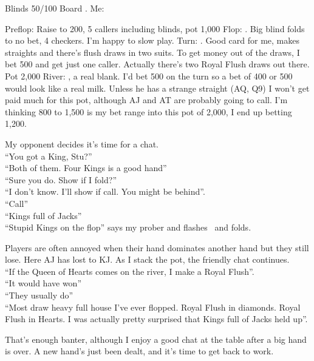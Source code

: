 Blinds 50/100 Board \Kd\Kh\Jd\tenh\tres. Me: \Kc\Jc

Preflop: Raise to 200, 5 callers including blinds, pot 1,000
Flop: \Kd\Kh\Jd. Big blind folds to no bet, 4 checkers. I'm happy to slow play.
Turn: \tenh. Good card for me, makes straights and there's flush draws in two
      suits. To get money out of the draws, I bet 500 and get just one caller.
      Actually there's two Royal Flush draws out there. Pot 2,000
River: \tres, a real blank. I'd bet 500 on the turn so a bet of 400 or 500 would
      look like a real milk. Unless he has a strange straight (AQ, Q9) I
      won't get paid much for this pot, although AJ and AT are probably going
      to call. I'm thinking 800 to 1,500 is my bet range into this pot of 2,000,
      I end up betting 1,200.

My opponent decides it's time for a chat.\\
``You got a King, Stu?'' \\
``Both of them. Four Kings is a good hand'' \\
``Sure you do. Show if I fold?'' \\
``I don't know. I'll show if call. You might be behind''. \\
``Call'' \\
``Kings full of Jacks'' \\
``Stupid Kings on the flop'' says my prober and flashes \Ah\Jh\ and folds.


Players are often annoyed when their hand dominates another hand but they
still lose. Here AJ has lost to KJ. As I stack the pot, the friendly
chat continues. \\
``If the Queen of Hearts comes on the river, I make a Royal Flush''. \\
``It would have won'' \\
``They usually do'' \\
``Most draw heavy full house I've ever flopped. Royal Flush in diamonds.
Royal Flush in Hearts. I was actually pretty surprised that Kings
full of Jacks held up''.

That's enough banter, although I enjoy a good chat at the table
after a big hand is over. A new hand's just been dealt, and
it's time to get back to work.

